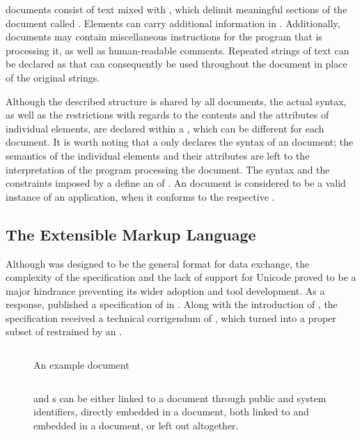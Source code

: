 \documentclass{book}
\begin{document}
 documents consist of text mixed with %
, which delimit meaningful sections of the document called
. Elements can carry additional
information in . Additionally,
 documents may contain miscellaneous instructions for the program
that is processing it, as well as human-readable comments. Repeated strings of
text can be declared as   that can
consequently be used throughout the document in place of the original strings.

Although the described structure is shared by all  documents, the
actual syntax, as well as the restrictions with regards to the contents and the
attributes of individual elements, are declared within a , which
can be different for each document. It is worth noting that a  only
declares the syntax of an  document; the semantics of the
individual elements and their attributes are left to the interpretation of the
program processing the document. The syntax and the constraints imposed by a
 define an   of
. An  document is considered to be a valid instance
of an  application, when it conforms to the respective
.

\subsection{The Extensible Markup Language}
Although  was designed to be the general format for data exchange,
the complexity of the specification and the lack of support for Unicode proved
to be a major hindrance preventing its wider adoption and tool development. As a
response,  published a specification of  in
\cite{bray98}. Along with the introduction of , the
 specification received a technical corrigendum of
\cite{goldfarb97:webSGML}, which turned  into a proper subset of
 restrained by an  .

\begin{figure}
  \inputminted{xml}{examples/02/recipe.xml}
  \caption{An example  document}
  \label{fig:recipe}\bigskip
  \inputminted{dtd}{examples/02/dtdtypes}
  \caption{ and  s can be either linked
    to a document through public and system identifiers, directly embedded in
    a document, both linked to and embedded in a document, or left out
    altogether.}
  \label{fig:recipe-dtd}
\end{figure}
        
\end{document}
